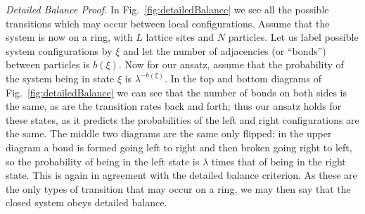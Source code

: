 \documentclass[
reprint,
 amsmath,amssymb,
 aps,
 prl,
]{revtex4-1}
\begin{document}
\textit{Detailed Balance Proof.} In Fig.~\ref{fig:detailedBalance} we see all the possible transitions which may occur between local configurations. Assume that the system is now on a ring, with $L$ lattice sites and $N$ particles.
Let us label possible system configurations by $\xi$ and let the number of adjacencies (or ``bonds'') between particles is $b(\xi)$. Now for our ansatz, assume that the probability of the system being in state $\xi$ is $\lambda^{-b(\xi)}$.
In the top and bottom diagrams of Fig.~\ref{fig:detailedBalance} we can see that the number of bonds on both sides is the same, as are the transition rates back and forth; thus our ansatz holds for these states, as it predicts the probabilities
of the left and right configurations are the same. The middle two diagrams are the same only flipped; in the upper diagram a bond is formed going left to right and then broken going right to left, so the probability of being in the left state is
$\lambda$ times that of being in the right state. This is again in agreement with the detailed balance criterion. As these are the only types of transition that may occur on a ring, we may then say that the closed system obeys detailed balance.
\end{document}
